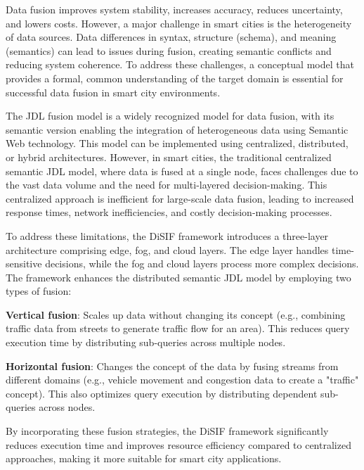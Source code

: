\documentclass[5p,times]{elsarticle}
\begin{document}
Data fusion improves system stability, increases accuracy, reduces uncertainty, and lowers costs. However, 
a major challenge in smart cities is the heterogeneity of data sources. Data differences in syntax, structure (schema),
 and meaning (semantics) can lead to issues during fusion, creating semantic conflicts and reducing system coherence.
  To address these challenges, a conceptual model that provides a formal, common understanding of the target domain is essential 
  for successful data fusion in smart city environments.


The JDL fusion model is a widely recognized model for data fusion, with its 
semantic version \cite{noughabi2013semfus} enabling the integration of heterogeneous data using Semantic Web technology. 
This model can be implemented using centralized, distributed, or hybrid architectures. However, 
in smart cities, the traditional centralized semantic JDL model, where data is fused at a single node,
 faces challenges due to the vast data volume and the need for multi-layered decision-making.
  This centralized approach is inefficient for large-scale data fusion, leading to increased response times, 
  network inefficiencies, and costly decision-making processes.

To address these limitations, the DiSIF framework introduces a three-layer architecture comprising edge,
 fog, and cloud layers. The edge layer handles time-sensitive decisions, while the fog and cloud layers 
 process more complex decisions. The framework enhances the distributed semantic JDL model by employing two types of fusion:

\textbf{Vertical fusion}: Scales up data without changing its concept (e.g., combining traffic data from streets to generate traffic flow for an area).
 This reduces query execution time by distributing sub-queries across multiple nodes.

\textbf{Horizontal fusion}: Changes the concept of the data by fusing streams from different domains (e.g., vehicle movement and congestion
 data to create a "traffic" concept). This also optimizes query execution by distributing dependent sub-queries across nodes.

By incorporating these fusion strategies, the DiSIF framework significantly reduces execution
 time and improves resource efficiency compared to centralized approaches, making it more suitable for smart city applications.
\end{document}

